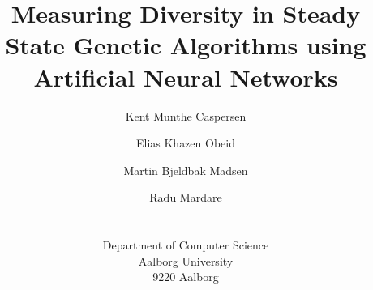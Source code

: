 \documentclass[a4paper]{IEEEconf}
\begin{document}
\title{Measuring Diversity in Steady State Genetic Algorithms using Artificial Neural Networks}

\author{%
  Kent Munthe Caspersen \\
  \and
  Elias Khazen Obeid \\
  \and
  Martin Bjeldbak Madsen \\
  \and
  Radu Mardare \\
   \\
  \begin{affiliation}
    Department of Computer Science\\
    Aalborg University\\
    9220 Aalborg
  \end{affiliation}
}

\maketitle



\thispagestyle{plain}









\end{document}
